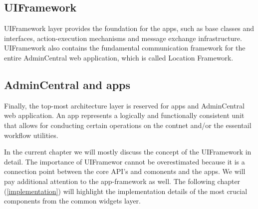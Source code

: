 \subsection{UIFramework} 
  UIFramework layer provides the foundation for the apps,
  such as base classes and interfaces, action-execution mechanisms and message
  exchange infrastructure. UIFramework also contains the fundamental
  communication framework for the entire AdminCentral web application, which is
  called Location Framework.
\subsection{AdminCentral and apps}
  Finally, the top-most architecture layer is reserved for apps and AdminCentral
  web application. An app represents a logically and functionally consistent
  unit that allows for conducting certain operations on the contnet and/or the
  essentail workflow utilities.

In the current chapter we will mostly discuss the concept of the UIFramework in
detail. The importance of UIFramewor cannot be overestimated because it is a connection
point between the core API's and comonents and the apps. We will pay additional
attention to the app-framework as well. The following chapter
(\ref{implementation}) will highlight the implementation details of the most
crucial components from the common widgets layer.
